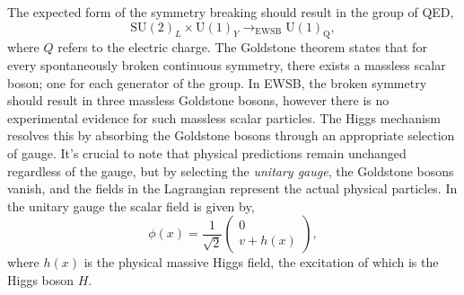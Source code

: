 The expected form of the symmetry breaking should result in the group of QED,
\begin{equation}
	\text{SU}(2)_L \times \text{U}(1)_Y \rightarrow_\text{EWSB} \text{U}(1)_\text{Q},
\end{equation}
where $Q$ refers to the electric charge.
The Goldstone theorem states that for every spontaneously broken continuous symmetry, there exists a massless scalar boson; one for each generator of the group.
In EWSB, the broken symmetry should result in three massless Goldstone bosons, however there is no experimental evidence for such massless scalar particles.
The Higgs mechanism resolves this by absorbing the Goldstone bosons through an appropriate selection of gauge.
It's crucial to note that physical predictions remain unchanged regardless of the gauge, but by selecting the \textit{unitary gauge}, the Goldstone bosons vanish, and the fields in the Lagrangian represent the actual physical particles.
In the unitary gauge the scalar field is given by,
\begin{equation}
	\label{eq:higgs_unitary_gauge}
	\phi(x) = \frac{1}{\sqrt{2}} \begin{pmatrix} 0 \\ v + h(x) \end{pmatrix},
\end{equation}
where $h(x)$ is the physical massive Higgs field, the excitation of which is the Higgs boson $H$.

